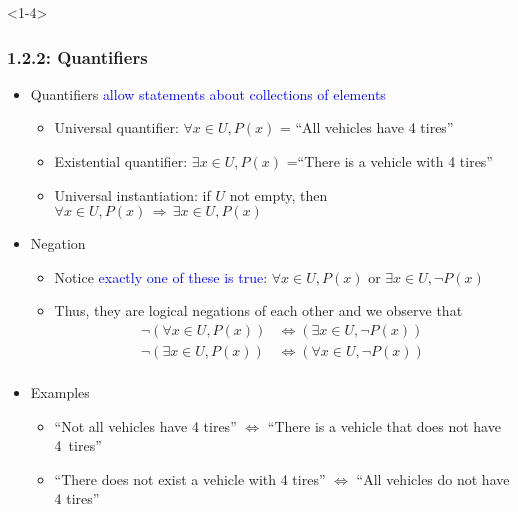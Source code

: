 \documentclass[10pt,english,aspectratio=169]{beamer}
\begin{document}
\begin{frame}<1-4> \frametitle{1.2.2: Quantifiers}

\begin{itemize}
\setlength\itemsep{2mm}
\item<1-> Quantifiers \textcolor{blue}{allow statements about collections of elements} \vspace{0.5mm}
\begin{itemize}
 \setlength\itemsep{1.5mm}
 \item Universal quantifier: $\forall x\!\in\! U, P(x)$ = ``All vehicles have 4 tires''
 \item Existential quantifier: $\exists x\!\in\! U, P(x)$ =``There is a vehicle with 4 tires''
 \item Universal instantiation: if $U$ not empty, then $\forall x \!\in\!U, P(x) \,\Rightarrow\, \exists x\!\in\! U, P(x)\!\!\!\!\!$ \vspace{0.5mm}
\end{itemize}

\item<2-> Negation \vspace{1mm}
\begin{itemize}
 \setlength\itemsep{1.5mm}
 \item Notice \textcolor{blue}{exactly one of these is true}: $\forall x\!\in\! U, P(x)$ or $\exists x\!\in\! U, \neg P(x)$
 \item<3-> Thus, they are logical negations of each other and we observe that \vspace{-1.5mm}
 \begin{align*}
   \neg \left(\forall x\!\in\! U, P(x) \right) &\Leftrightarrow \left( \exists x\!\in\! U, \neg P(x) \right) \\
   \neg \left(\exists x\!\in\! U, P(x) \right) &\Leftrightarrow \left( \forall x\!\in\! U, \neg P(x) \right) \\[-9mm]
 \end{align*}   
\end{itemize}

\item<4-> Examples \vspace{0.5mm}
\begin{itemize}
 \setlength\itemsep{1.5mm}
 \item ``Not all vehicles have 4 tires'' $\Leftrightarrow$ ``There is a vehicle that does not have 4~tires''$\!\!\!\!\!\!\!\!\!\!\!\!\!\!\!\!$
 \item ``There does not exist a vehicle with 4 tires'' $\Leftrightarrow$ ``All vehicles do not have 4 tires''\hspace*{-15mm}
  

\end{itemize}
\end{itemize}
\end{frame}
\end{document}
